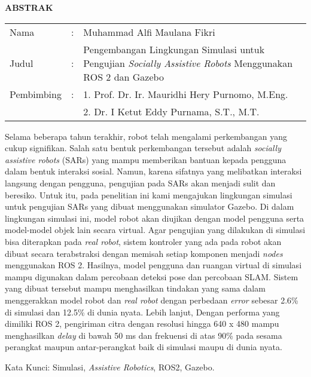\begin{center}
  \large\textbf{ABSTRAK}
\end{center}

\vspace{2ex}

\begingroup
  \setlength{\tabcolsep}{0pt}
  \noindent
  \begin{tabularx}{\textwidth}{l >{\centering}m{2em} X}
    Nama        &:& Muhammad Alfi Maulana Fikri \\
    Judul       &:&	Pengembangan Lingkungan Simulasi untuk Pengujian \emph{Socially Assistive Robots} Menggunakan ROS 2 dan Gazebo \\
    Pembimbing  &:& 1. Prof. Dr. Ir. Mauridhi Hery Purnomo, M.Eng. \\
                & & 2. Dr. I Ketut Eddy Purnama, S.T., M.T. \\
  \end{tabularx}
\endgroup

Selama beberapa tahun terakhir,
  robot telah mengalami perkembangan yang cukup signifikan.
Salah satu bentuk perkembangan tersebut adalah \emph{socially assistive robots} (SARs) yang mampu memberikan bantuan kepada pengguna dalam bentuk interaksi sosial.
Namun,
  karena sifatnya yang melibatkan interaksi langsung dengan pengguna,
  pengujian pada SARs akan menjadi sulit dan beresiko.
Untuk itu,
  pada penelitian ini kami mengajukan lingkungan simulasi untuk pengujian SARs yang dibuat menggunakan simulator Gazebo.
Di dalam lingkungan simulasi ini,
  model robot akan diujikan dengan model pengguna serta model-model objek lain secara virtual.
Agar pengujian yang dilakukan di simulasi bisa diterapkan pada \emph{real robot},
  sistem kontroler yang ada pada robot akan dibuat secara terabstraksi dengan memisah setiap komponen menjadi \emph{nodes} menggunakan ROS 2.
Hasilnya,
  model pengguna dan ruangan virtual di simulasi mampu digunakan dalam percobaan deteksi pose dan percobaan SLAM.
Sistem yang dibuat tersebut mampu menghasilkan tindakan yang sama dalam menggerakkan model robot dan \emph{real robot} dengan perbedaan \emph{error} sebesar 2.6\% di simulasi dan 12.5\% di dunia nyata.
Lebih lanjut, Dengan performa yang dimiliki ROS 2,
  pengiriman citra dengan resolusi hingga 640 x 480 mampu menghasilkan \emph{delay} di bawah 50 ms dan frekuensi di atas 90\% pada sesama perangkat maupun antar-perangkat baik di simulasi maupu di dunia nyata.

Kata Kunci: Simulasi, \emph{Assistive Robotics}, ROS2, Gazebo.
